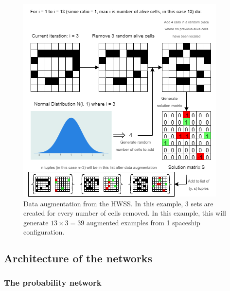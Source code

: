 \documentclass{l4proj}
\begin{document}
\begin{figure}[h!]
\centering
\includegraphics[width=1\linewidth]{dissertation/images/diagrams/data_augmentation_implementation.png}
\caption{Data augmentation from the HWSS. In this example, 3 sets are created for every number of cells removed. In this example, this will generate $13 \times 3 = 39$ augmented examples from 1 spaceship configuration.}
\label{fig:subim1}
\end{figure}


\subsection{Architecture of the networks}

\subsubsection{The probability network}
\end{document}
